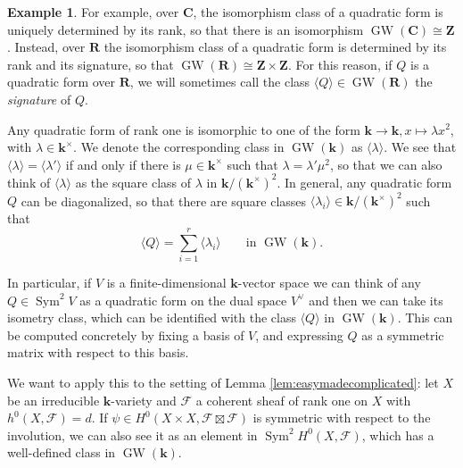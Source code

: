 \documentclass[12pt]{amsart}
\newcounter{thmcounter}
\numberwithin{equation}{section}
\numberwithin{thmcounter}{section}
\theoremstyle{definition}
\newtheorem{example}[thmcounter]{Example}
\theoremstyle{claim}
\newcommand{\nZ}{\mathbf{Z}}
\newcommand{\nR}{\mathbf{R}}
\newcommand{\nC}{\mathbf{C}}
\newcommand{\kk}{\mathbf{k}}
\newcommand{\sF}{\mathscr{F}}
\DeclareMathOperator{\Sym}{Sym}
\DeclareMathOperator{\GW}{GW}
\begin{document}
\begin{example}
For example, over $\nC$, the isomorphism class of a quadratic form is uniquely determined by its rank, so that there is an isomorphism $\GW(\nC) \cong \mathbf{Z}$. Instead, over $\nR$ the isomorphism class of a quadratic form is determined by its rank and its signature, so that $\GW(\nR)\cong \nZ \times \nZ$. For this reason, if $Q$ is a quadratic form over $\nR$, we will sometimes call the class $\langle  Q\rangle \in \GW(\nR)$  the \emph{signature} of $Q$.
\end{example}

Any quadratic form of rank one is isomorphic to one of the form $\kk \to \kk,x\mapsto \lambda x^2$, with $\lambda\in \kk^{\times}$. We denote the corresponding class in $\GW(\kk)$ as $\langle \lambda \rangle$. We see that $\langle \lambda \rangle = \langle \lambda' \rangle$ if and only if there is $\mu\in \kk^{\times}$ such that $\lambda = \lambda'\mu^2$, so that we can also think of $\langle \lambda \rangle$ as the square class of $\lambda$ in $\kk/(\kk^{\times})^2$. In general, any quadratic form $Q$ can be diagonalized, so that there are square classes $\langle \lambda_i \rangle\in \kk/(\kk^{\times})^2$ such that
\[ \langle Q \rangle = \sum_{i=1}^r \langle  \lambda_i \rangle \qquad \text{in } \GW(\kk).\]

In particular, if $V$ is a finite-dimensional $\kk$-vector space we can think of any $Q\in \operatorname{Sym}^2 V$ as a quadratic form on the dual space $V^{\vee}$ and then we can take its isometry class, which can be identified with the class $\langle Q \rangle$ in $\GW(\kk)$. This can be computed concretely by fixing a basis of $V$, and expressing $Q$ as a symmetric matrix with respect to this basis.
\medskip

We want to apply this to the setting of Lemma \ref{lem:easymadecomplicated}: let $X$ be an irreducible $\kk$-variety and $\sF$ a coherent sheaf of rank one on $X$ with $h^0(X,\sF)=d$. If $\psi\in H^0(X\times X,\sF\boxtimes \sF)$ is symmetric with respect to the involution, we can also see it as an element in $\Sym^2H^0(X,\sF)$, which has a well-defined class in $\GW(\kk)$.
\end{document}

